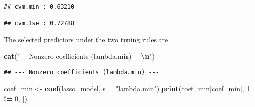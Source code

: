 \documentclass[
  11pt,
]{article}
\newenvironment{Shaded}{\begin{snugshade}}{\end{snugshade}}
\newcommand{\AttributeTok}[1]{\textcolor[rgb]{0.13,0.29,0.53}{#1}}
\newcommand{\DecValTok}[1]{\textcolor[rgb]{0.00,0.00,0.81}{#1}}
\newcommand{\FloatTok}[1]{\textcolor[rgb]{0.00,0.00,0.81}{#1}}
\newcommand{\FunctionTok}[1]{\textcolor[rgb]{0.13,0.29,0.53}{\textbf{#1}}}
\newcommand{\NormalTok}[1]{#1}
\newcommand{\OtherTok}[1]{\textcolor[rgb]{0.56,0.35,0.01}{#1}}
\newcommand{\SpecialCharTok}[1]{\textcolor[rgb]{0.81,0.36,0.00}{\textbf{#1}}}
\newcommand{\StringTok}[1]{\textcolor[rgb]{0.31,0.60,0.02}{#1}}
\begin{document}
\begin{Shaded}
\end{Shaded}

\begin{verbatim}
## cvm.min : 0.63210
\end{verbatim}

\begin{Shaded}
\end{Shaded}

\begin{verbatim}
## cvm.1se : 0.72788
\end{verbatim}

The selected predictors under the two tuning rules are

\begin{Shaded}
\begin{Highlighting}[]
\FunctionTok{cat}\NormalTok{(}\StringTok{"{-}{-}{-} Nonzero coefficients (lambda.min) {-}{-}{-}}\SpecialCharTok{\textbackslash{}n}\StringTok{"}\NormalTok{)}
\end{Highlighting}
\end{Shaded}

\begin{verbatim}
## --- Nonzero coefficients (lambda.min) ---
\end{verbatim}

\begin{Shaded}
\begin{Highlighting}[]
\NormalTok{coef\_min }\OtherTok{\textless{}{-}} \FunctionTok{coef}\NormalTok{(lasso\_model, }\AttributeTok{s =} \StringTok{"lambda.min"}\NormalTok{)}
\FunctionTok{print}\NormalTok{(coef\_min[coef\_min[, }\DecValTok{1}\NormalTok{] }\SpecialCharTok{!=} \DecValTok{0}\NormalTok{, ]) }
\end{Highlighting}
\end{Shaded}
\end{document}
